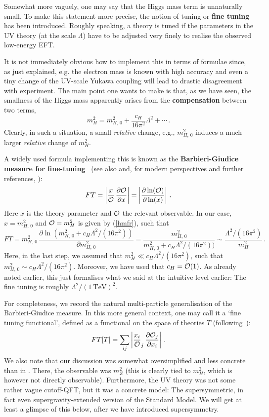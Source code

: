 \documentclass[12pt]{article}
\newcommand{\be}{\begin{equation}}
\newcommand{\ee}{\end{equation}}
\numberwithin{equation}{section}
\begin{document}
Somewhat more vaguely, one may say that the Higgs mass term is unnaturally small. To make this statement more precise, the notion of tuning or {\bf fine tuning} has been introduced. Roughly speaking, a theory is tuned if the  parameters in the UV theory (at the scale $\Lambda$) have to be adjusted very finely to realise the observed low-energy EFT.

It is not immediately obvious how to implement this in terms of formulae since, as just explained, e.g. the electron mass is known with high accuracy and even a tiny change of the UV-scale Yukawa coupling will lead to drastic disagreement with experiment. The main point one wants to make is that, as we have seen, the smallness of the Higgs mass apparently arises from the {\bf compensation} between two terms,
\be
m_H^2=m_{H,\,0}^2+\frac{c_H}{16\pi^2}\Lambda^2+\cdots\,.\label{hmfr}
\ee
Clearly, in such a situation, a small {\it relative} change, e.g., $m_{H,\,0}^2$ induces a much larger {\it relative} change of $m_H^2$. 

A widely used formula implementing this is known as the {\bf Barbieri-Giudice measure for fine-tuning}~\cite{Barbieri:1987fn} (see also \cite{Ellis:1986yg} and, for modern perspectives and further references, \cite{Wells:2018sus, Azhar:2018lzd}):
\be
FT=\left|\frac{x}{\cal O}\,\frac{\partial {\cal O}}{\partial x}\right|=
\left|
\frac{\partial \ln({\cal O})}{\partial \ln(x)}\right|\,.
\ee
Here $x$ is the theory parameter and ${\cal O}$ the relevant observable. In our case, $x=m_{H,\,0}^2$ and ${\cal O}=m_H^2$ is given by (\ref{hmfr}), such that
\be
FT=m_{H,\,0}^2\,\frac{\partial \ln(m_{H,\,0}^2+c_H\Lambda^2/ (16\pi^2))}{\partial m_{H,\,0}^2}=\frac{m_{H,\,0}^2}{m_{H,\,0}^2+c_H\Lambda^2/ (16\pi^2))}\sim \frac{\Lambda^2/(16\pi^2)}{m_H^2}\,.
\ee
Here, in the last step, we assumed that $m_H^2\ll c_H\Lambda^2/(16\pi^2)$, such that $m_{H,\,0}^2\sim c_H\Lambda^2/(16\pi^2)$. Moreover, we have used that $c_H={\cal O}(1)$. As already noted earlier, this just formalises what we said at the intuitive level earlier: The fine tuning is roughly $\Lambda^2/(1~\mbox{TeV})^2$. 

For completeness, we record the natural multi-particle generalisation of the  Barbieri-Giudice measure. In this more general context, one may call it a `fine tuning functional', defined as a functional on the space of theories $T$ (following~\cite{Wells:2018sus}):
\be
FT[T]=\sum_{ij} \left|\frac{x_i}{\cal O}_j\,\frac{\partial {\cal O}_j}{\partial x_i}\right|\,.
\ee
We also note that our discussion was somewhat oversimplified and less concrete than in \cite{Barbieri:1987fn}. There, the observable was $m_Z^2$ (this is clearly tied to $m_H^2$, which is however not directly observable). Furthermore, the UV theory was not some rather vague cutoff-QFT, but it was a concrete model: The supersymmetric, in fact even supergravity-extended version of the Standard Model. We will get at least a glimpse of this below, after we have introduced supersymmetry.
\end{document}
